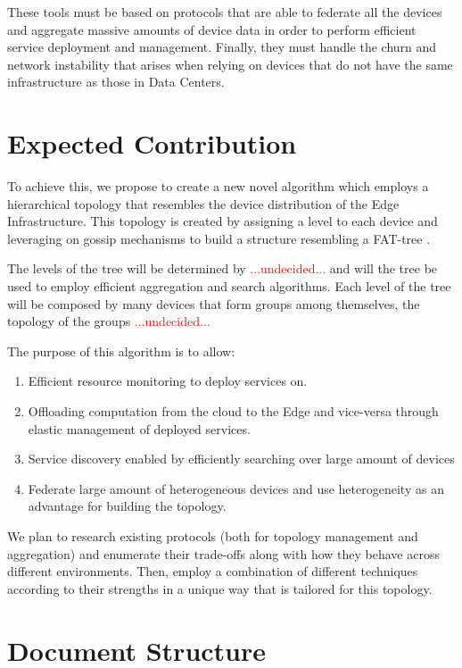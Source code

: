These tools must be based on protocols that are able to federate all the devices and aggregate massive amounts of device data in order to perform efficient service deployment and management. Finally, they must handle the churn and network instability that arises when relying on devices that do not have the same infrastructure as those in Data Centers.

\section{Expected Contribution}

To achieve this, we propose to create a new novel algorithm which employs a hierarchical topology that resembles the device distribution of the Edge Infrastructure. This topology is created by assigning a level to each device and leveraging on gossip mechanisms to build a structure resembling a FAT-tree \cite{}.

The levels of the tree will be determined by \textcolor{red}{...undecided...} and will the tree be used to employ efficient aggregation and search algorithms. Each level of the tree will be composed by many devices that form groups among themselves, the topology of the groups \textcolor{red}{...undecided...} 

The purpose of this algorithm is to allow:

\begin{enumerate} 
    \item Efficient resource monitoring to deploy services on.
    \item Offloading computation from the cloud to the Edge and vice-versa through elastic management of deployed services.
    \item Service discovery enabled by efficiently searching over large amount of devices
    \item Federate large amount of heterogeneous devices and use heterogeneity as an advantage for building the topology.
\end{enumerate}

We plan to research existing protocols (both for topology management and aggregation) and enumerate their trade-offs along with how they behave across different environments. Then, employ a combination of different techniques according to their strengths in a unique way that is tailored for this topology.

\section{Document Structure}

